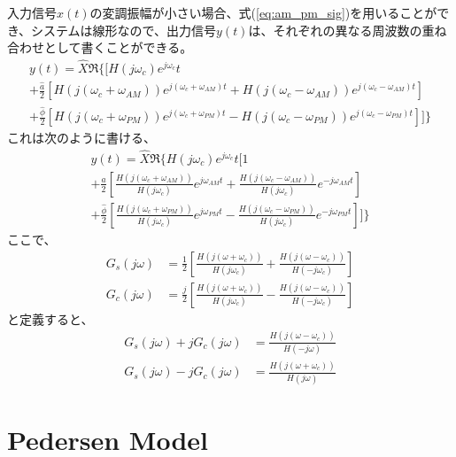\documentclass[book]{jlreq}
\begin{document}
入力信号$x(t)$の変調振幅が小さい場合、式(\ref{eq:am_pm_sig})を用いることができ、システムは線形なので、出力信号$y(t)$は、それぞれの異なる周波数の重ね合わせとして書くことができる。
%
\begin{multline}
    y(t) = \hat{X}\Re\biggr\{\biggr [H(j\omega_c)e^{j\omega_c}t \\
        + \frac{\hat{a}}{2}\left[H(j(\omega_c+\omega_{AM}))e^{j(\omega_c+\omega_{AM})t}
            + H(j(\omega_c-\omega_{AM}))e^{j(\omega_c-\omega_{AM})t}\right] \\
        + \frac{\hat{\phi}}{2}\left[H(j(\omega_c+\omega_{PM}))e^{j(\omega_c+\omega_{PM})t}
            - H(j(\omega_c-\omega_{PM}))e^{j(\omega_c-\omega_{PM})t}\right] \biggl ]\biggl\}
\end{multline}
%
これは次のように書ける、
%
\begin{multline}
    y(t) = \hat{X}\Re\biggr\{H(j\omega_c)e^{j\omega_c}t\biggr[ 1\\
    + \frac{\hat{a}}{2}\left[\frac{H(j(\omega_c+\omega_{AM}))}{H(j\omega_c)}e^{j\omega_{AM}t}
    + \frac{H(j(\omega_c-\omega_{AM}))}{H(j\omega_c)}e^{-j\omega_{AM}t}\right] \\
    + \frac{\hat{\phi}}{2}\left[\frac{H(j(\omega_c+\omega_{PM}))}{H(j\omega_c)}e^{j\omega_{PM}t}
    - \frac{H(j(\omega_c-\omega_{PM}))}{H(j\omega_c)}e^{-j\omega_{PM}t}\right] \biggl ]\biggl\}
\end{multline}
%
ここで、
%
\begin{align}
    G_s(j\omega) & =
    \frac{1}{2}\left[\frac{H(j(\omega+\omega_c))}{H(j\omega_c)}+\frac{H(j(\omega-\omega_c))}{H(-j\omega_c)} \right] \\
    G_c(j\omega) & =
    \frac{j}{2}\left[\frac{H(j(\omega+\omega_c))}{H(j\omega_c)}-\frac{H(j(\omega-\omega_c))}{H(-j\omega_c)} \right]
\end{align}
%
と定義すると、
%
\begin{align}
    G_s(j\omega)+j G_c(j\omega) & = \frac{H(j(\omega-\omega_c))}{H(-j\omega)} \\
    G_s(j\omega)-j G_c(j\omega) & = \frac{H(j(\omega+\omega_c))}{H(j\omega)}
\end{align}


\section{Pedersen Model}
\end{document}
